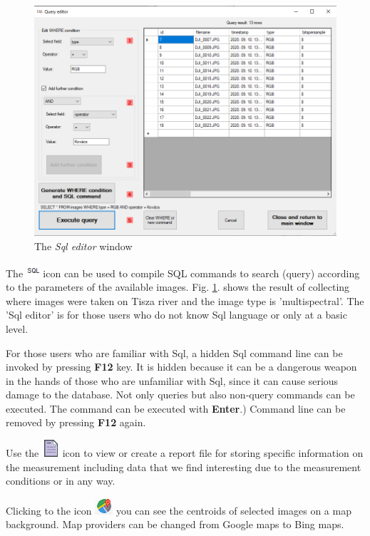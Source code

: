 \documentclass[a4paper,12pt]{article}
\begin{document}
\begin{figure}
	\centering
	\includegraphics[width=12cm]{sqleditor.png}
	\caption{The \textit{Sql editor} window}
	\label{fig:sqleditor}
\end{figure}

The \includegraphics [width = 0.5cm] {sql.png} icon can be used to compile SQL commands to search (query) according to the parameters of the available images. Fig. \ref {fig:sqleditor}. shows the result of collecting where images were taken on Tisza river and the image type is 'multispectral'. The 'Sql editor' is for those users who do not know Sql language or only at a basic level.

For those users who are familiar with Sql, a hidden Sql command line can be invoked by pressing \textbf{F12} key. It is hidden because it can be a dangerous weapon in the hands of those who are unfamiliar with Sql, since it can cause serious damage to the database. Not only queries but also non-query commands can be executed. The command can be executed with \textbf {Enter}.) Command line can be removed by pressing \textbf{F12} again.

Use the \includegraphics [width = 0.5 cm] {sheet.png} icon to view or create a report file for storing specific information on the measurement including data that we find interesting due to the measurement conditions or in any way. 

Clicking to the icon \includegraphics{mapviewer_ikon.png} you can see the centroids of selected images on a map background. Map providers can be changed from Google maps to Bing maps.
\end{document}

